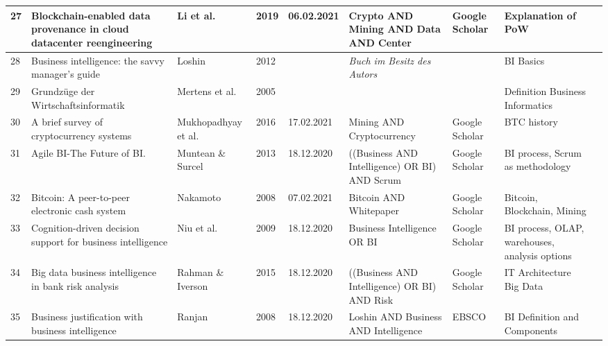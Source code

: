 \begin{table}[H]
\begin{tabularx}{\textwidth}[ht]{|l|X|X|l|l|X|l|X|X|}
		\hline
		27 & Blockchain-enabled data provenance in cloud datacenter reengineering & Li et al. & 2019 & 06.02.2021 & Crypto AND Mining AND Data AND Center & Google Scholar & Explanation of PoW \\
		\hline
		28 & Business intelligence: the savvy manager's guide & Loshin & 2012 &  & \textit{Buch im Besitz des Autors} &  & BI Basics \\
		\hline
		29 & Grundz{\"u}ge der Wirtschaftsinformatik & Mertens et al. & 2005 & & & & Definition Business Informatics \\
		\hline
		30 & A brief survey of cryptocurrency systems & Mukhopadhyay et al. & 2016 & 17.02.2021 & Mining AND Cryptocurrency & Google Scholar & BTC history \\
		\hline
		31 & Agile BI-The Future of BI. & Muntean \& Surcel & 2013 & 18.12.2020 & ((Business AND Intelligence) OR BI) AND Scrum & Google Scholar & BI process, Scrum as methodology \\
		\hline
		32 & Bitcoin: A peer-to-peer electronic cash system & Nakamoto & 2008 & 07.02.2021 & Bitcoin AND Whitepaper & Google Scholar & Bitcoin, Blockchain, Mining \\
		\hline
		33 & Cognition-driven decision support for business intelligence & Niu et al. & 2009 & 18.12.2020 & Business Intelligence OR BI & Google Scholar & BI process, OLAP, warehouses, analysis options \\
		\hline
		34 & Big data business intelligence in bank risk analysis & Rahman \& Iverson & 2015 & 18.12.2020 & ((Business AND Intelligence) OR BI) AND Risk & Google Scholar & IT Architecture Big Data \\
		\hline
		35 & Business justification with business intelligence & Ranjan & 2008 & 18.12.2020 & Loshin AND Business AND Intelligence & EBSCO & BI Definition and Components \\
		\hline
	\end{tabularx}
\end{table}

